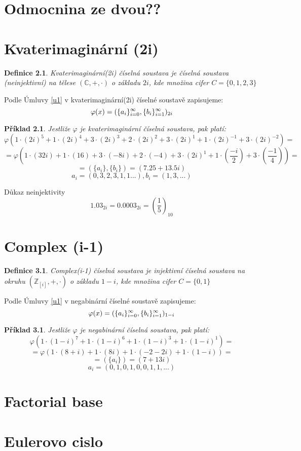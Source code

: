 \documentclass[12pt]{book}
\newtheorem{definice}{Definice}
\newtheorem{pr}{Příklad}
\begin{document}
\chapter{Odmocnina ze dvou??}

\newpage

\chapter{Kvaterimaginární (2i)}

\begin{definice}
	Kvaterimaginární(2i) číselná soustava je číselná soustava (neinjektivní) na tělese $(\mathbb{C},+,\cdot)$ o základu $2i$, kde množina cifer $C = \{0,1,2,3\}$
\end{definice}

Podle Úmluvy \ref{u1} v kvaterimaginární(2i) číselné soustavě zapisujeme:
$$\varphi(x) = (\{a_i\}_{i=0}^{\infty},\{b_i\}_{i=1}^{\infty})_{2i}$$


\begin{pr}
	Jestliže $\varphi$ je kvaterimaginární číselná soustava, pak platí:
	$$\varphi(1\cdot(2i)^5+1\cdot(2i)^4+3\cdot(2i)^3+2\cdot(2i)^2+3\cdot(2i)^1+1\cdot(2i)^{-1}+3\cdot(2i)^{-2})=$$
	$$=\varphi(1\cdot(32i)+1\cdot(16)+3\cdot(-8i)+2\cdot(-4)+3\cdot(2i)^1+1\cdot(\frac{-i}{2})+3\cdot(\frac{-1}{4}))=$$
	$$=(\{a_i\},\{b_i\})=(7.25+13.5i)$$
	$${a_i}=(0,3,2,3,1,1...),{b_i}=(1,3,...) $$
\end{pr}

Důkaz neinjektivity
$$1.03_{2i} = 0.0003_{2i} = \left(\frac{1}{5}\right)_{10}$$

\newpage

\chapter{Complex (i-1)}

\begin{definice}
	Complex(i-1) číselná soustava je injektivní číselná soustava na okruhu $(\mathbb{Z}_{[i]},+,\cdot)$ o základu $1-i$, kde množina cifer $C = \{0,1\}$
\end{definice}

Podle Úmluvy \ref{u1} v negabinární číselné soustavě zapisujeme:
$$\varphi(x) = (\{a_i\}_{i=0}^{\infty},\{b_i\}_{i=1}^{\infty})_{1-i}$$


\begin{pr}
	Jestliže $\varphi$ je negabinární číselná soustava, pak platí:
	$$\varphi(1\cdot(1-i)^7+1\cdot(1-i)^6+1\cdot(1-i)^3+1\cdot(1-i)^1)=$$
	$$=\varphi(1\cdot(8+i)+1\cdot(8i)+1\cdot(-2-2i)+1\cdot(1-i))=$$
	$$=(\{a_i\})=(7+13i)$$
	$${a_i}=(0,1,0,1,0,0,1,1,...) $$
\end{pr}

\newpage

\chapter{Factorial base}

\newpage

\chapter{Eulerovo cislo}
\end{document}
